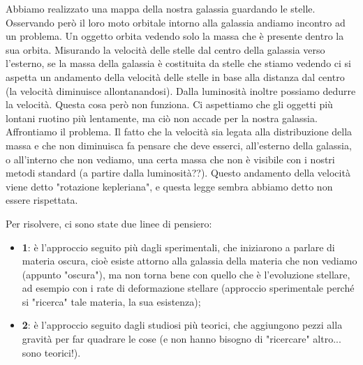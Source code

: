 \documentclass[a4paper,11pt]{article}
\begin{document}
Abbiamo realizzato una mappa della nostra galassia guardando le stelle. Osservando però il loro moto orbitale intorno alla galassia andiamo incontro ad un problema. Un oggetto orbita vedendo solo la massa che è presente dentro la sua orbita. Misurando la velocità delle stelle dal centro della galassia verso l'esterno, se la massa della galassia è costituita da stelle che stiamo vedendo ci si aspetta un andamento della velocità delle stelle in base alla distanza dal centro (la velocità diminuisce allontanandosi). Dalla luminosità inoltre possiamo dedurre la velocità. Questa cosa però non funziona. Ci aspettiamo che gli oggetti più lontani ruotino più lentamente, ma ciò non accade per la nostra galassia. Affrontiamo il problema. Il fatto che la velocità sia legata alla distribuzione della massa e che non diminuisca fa pensare che deve esserci, all'esterno della galassia, o all'interno che non vediamo, una certa massa che non è visibile con i nostri metodi standard (a partire dalla luminosità??). Questo andamento della velocità viene detto "rotazione kepleriana", e questa legge sembra abbiamo detto non essere rispettata.

Per risolvere, ci sono state due linee di pensiero:
\begin{itemize}
    \item \textbf{1}: è l'approccio seguito più dagli sperimentali, che iniziarono a parlare di materia oscura, cioè esiste attorno alla galassia della materia che non vediamo (appunto "oscura"), ma non torna bene con quello che è l'evoluzione stellare, ad esempio con i rate di deformazione stellare (approccio sperimentale perché si "ricerca" tale materia, la sua esistenza);
    \item \textbf{2}: è l'approccio seguito dagli studiosi più teorici, che aggiungono pezzi alla gravità per far quadrare le cose (e non hanno bisogno di "ricercare" altro... sono teorici!).
\end{itemize}
\end{document}
